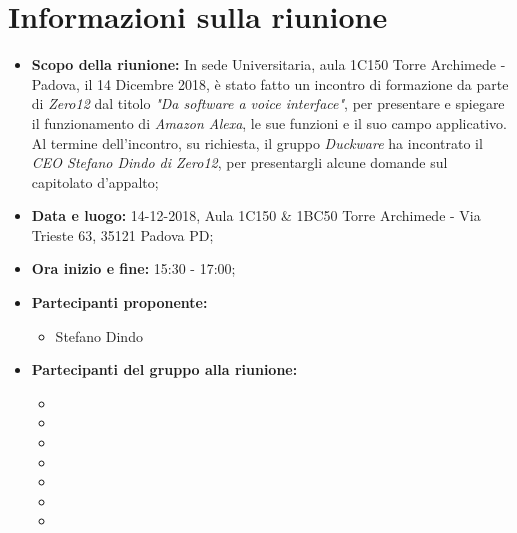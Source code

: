 \clearpage
\section{Informazioni sulla riunione}
\begin{itemize}
	\item \textbf {Scopo della riunione:} In sede Universitaria, aula 1C150 Torre Archimede - Padova, il 14 Dicembre 2018, è stato fatto un incontro di formazione da parte di \emph{Zero12} dal titolo \emph{"Da software a voice interface"}, per presentare e spiegare il funzionamento di \emph{Amazon Alexa}, le sue funzioni e il suo campo applicativo. Al termine dell'incontro, su richiesta, il gruppo \emph{Duckware} ha incontrato il \emph{CEO Stefano Dindo di Zero12}, per presentargli alcune domande sul capitolato d'appalto;
	
	\item \textbf {Data e luogo:} 14-12-2018, Aula 1C150 \& 1BC50 Torre Archimede - Via Trieste 63, 35121 Padova PD;
	
	\item \textbf {Ora inizio e fine:} 15:30 - 17:00;
	
	\item \textbf {Partecipanti proponente:} 
		\begin{itemize}
			\item Stefano Dindo
		\end{itemize}
	
	\item \textbf {Partecipanti del gruppo alla riunione:} 
		 \begin{itemize}
			\item \sonia
			\item \luca
			\item \matteo
			\item \pardeep
			\item \alberto
			\item \alessandro
			\item \andrea
		\end{itemize}
\end{itemize}